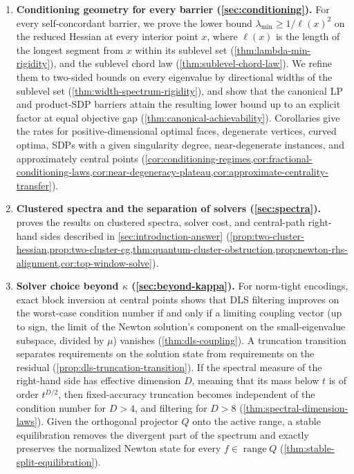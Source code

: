 \begin{enumerate}[leftmargin=*]
 \item \textbf{Conditioning geometry for every barrier (\cref{sec:conditioning}).}
 For every self-concordant barrier, we prove the lower bound
 \(\lambda_{\min}\geq1/\ell(x)^2\) on the reduced Hessian at every interior
 point \(x\), where \(\ell(x)\) is the length of the longest segment from
 \(x\) within its sublevel set (\cref{thm:lambda-min-rigidity}), and the
 sublevel chord law (\cref{thm:sublevel-chord-law}).  We refine them to
 two-sided bounds on every eigenvalue by directional widths of the sublevel
 set (\cref{thm:width-spectrum-rigidity}), and show that the canonical LP and
 product-SDP barriers attain the resulting lower bound up to an explicit
 factor at equal objective gap (\cref{thm:canonical-achievability}).
 Corollaries give the rates for
 positive-dimensional optimal faces, degenerate vertices, curved optima, SDPs
 with a given singularity degree, near-degenerate instances, and
 approximately central points
 (\cref{cor:conditioning-regimes,cor:fractional-conditioning-laws,cor:near-degeneracy-plateau,cor:approximate-centrality-transfer}).

 \item \textbf{Clustered spectra and the separation of solvers
 (\cref{sec:spectra}).}   proves the results on clustered
 spectra, solver cost, and central-path right-hand sides described in
 \cref{sec:introduction-answer}
 (\cref{prop:two-cluster-hessian,prop:two-cluster-cg,thm:quantum-cluster-obstruction,prop:newton-rhs-alignment,cor:top-window-solve}).

 \item \textbf{Solver choice beyond \(\kappa\)
 (\cref{sec:beyond-kappa}).}  For norm-tight encodings, exact block
 inversion at central points shows that DLS filtering improves on the
 worst-case condition number if and only if a limiting coupling vector (up
 to sign, the limit of the Newton solution's component on the
 small-eigenvalue subspace, divided by \(\mu\)) vanishes
 (\cref{thm:dls-coupling}).  A truncation transition separates requirements on
 the solution state from requirements on the residual
 (\cref{prop:dls-truncation-transition}).  If the spectral measure of the
 right-hand side has effective dimension \(D\), meaning that its mass below
 \(t\) is of order \(t^{D/2}\), then fixed-accuracy truncation becomes
 independent of the condition number for \(D>4\), and filtering for \(D>8\)
 (\cref{thm:spectral-dimension-laws}).  Given the orthogonal projector \(Q\)
 onto the active range, a stable equilibration removes the divergent part of
 the spectrum and exactly preserves the normalized Newton state for every
 \(f\in\operatorname{range}Q\) (\cref{thm:stable-split-equilibration}).


\end{enumerate}
